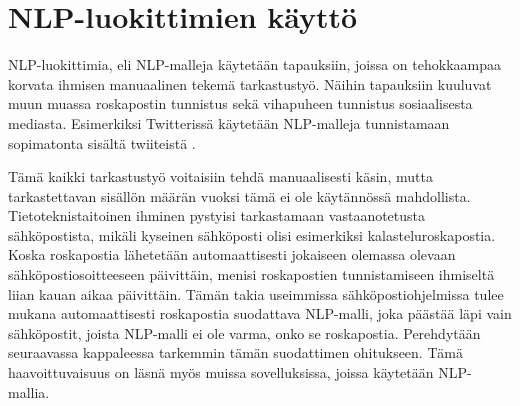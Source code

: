 \chapter{NLP-luokittimien käyttö\label{methods}}

NLP-luokittimia, eli NLP-malleja käytetään tapauksiin, joissa on tehokkaampaa korvata ihmisen manuaalinen tekemä tarkastustyö. Näihin tapauksiin kuuluvat muun muassa roskapostin tunnistus sekä vihapuheen tunnistus sosiaalisesta mediasta. Esimerkiksi Twitterissä käytetään NLP-malleja tunnistamaan sopimatonta sisältä twiiteistä \citep{twitternlp}.

Tämä kaikki tarkastustyö voitaisiin tehdä manuaalisesti käsin, mutta tarkastettavan sisällön määrän vuoksi tämä ei ole käytännössä mahdollista. Tietoteknistaitoinen ihminen pystyisi tarkastamaan vastaanotetusta sähköpostista, mikäli kyseinen sähköposti olisi esimerkiksi kalasteluroskapostia. Koska roskapostia lähetetään automaattisesti jokaiseen olemassa olevaan sähköpostiosoitteeseen päivittäin, menisi roskapostien tunnistamiseen ihmiseltä liian kauan aikaa päivittäin. Tämän takia useimmissa sähköpostiohjelmissa tulee mukana automaattisesti roskapostia suodattava NLP-malli, joka päästää läpi vain sähköpostit, joista NLP-malli ei ole varma, onko se roskapostia. Perehdytään seuraavassa kappaleessa tarkemmin tämän suodattimen ohitukseen. Tämä haavoittuvaisuus on läsnä myös muissa sovelluksissa, joissa käytetään NLP-mallia.